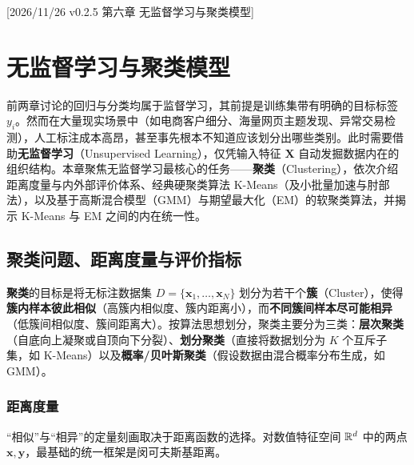 %
%
[2026/11/26 v0.2.5 第六章 无监督学习与聚类模型]
\chapter{无监督学习与聚类模型}\label{ch:clustering}

前两章讨论的回归与分类均属于监督学习，其前提是训练集带有明确的目标标签 $y_i$。然而在大量现实场景中（如电商客户细分、海量网页主题发现、异常交易检测），人工标注成本高昂，甚至事先根本不知道应该划分出哪些类别。此时需要借助\textbf{无监督学习}（Unsupervised Learning），仅凭输入特征 $\bm{X}$ 自动发掘数据内在的组织结构。本章聚焦无监督学习最核心的任务——\textbf{聚类}（Clustering），依次介绍距离度量与内外部评价体系、经典硬聚类算法 K-Means（及小批量加速与肘部法），以及基于高斯混合模型（GMM）与期望最大化（EM）的软聚类算法，并揭示 K-Means 与 EM 之间的内在统一性。

\section{聚类问题、距离度量与评价指标}\label{sec:clustering-basics}

\textbf{聚类}的目标是将无标注数据集 $D = \{\bm{x}_1, \dots, \bm{x}_N\}$ 划分为若干个\textbf{簇}（Cluster），使得\textbf{簇内样本彼此相似}（高簇内相似度、簇内距离小），而\textbf{不同簇间样本尽可能相异}（低簇间相似度、簇间距离大）。按算法思想划分，聚类主要分为三类：\textbf{层次聚类}（自底向上凝聚或自顶向下分裂）、\textbf{划分聚类}（直接将数据划分为 $K$ 个互斥子集，如 K-Means）以及\textbf{概率/贝叶斯聚类}（假设数据由混合概率分布生成，如 GMM）。

\subsection{距离度量}

“相似”与“相异”的定量刻画取决于距离函数的选择。对数值特征空间 $\mathbb{R}^d$ 中的两点 $\bm{x}, \bm{y}$，最基础的统一框架是闵可夫斯基距离。

